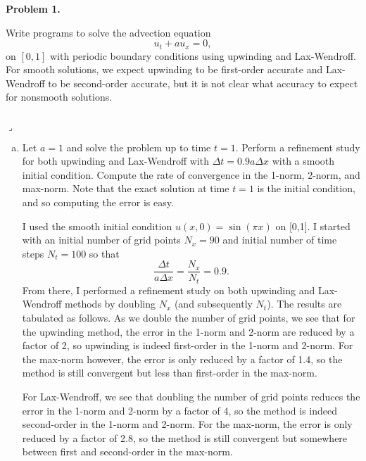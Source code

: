 \documentclass[12pt]{article}
\newenvironment{myprob}[1]
    {%
    \noindent{\Huge$\ulcorner$}\textbf{#1.}\begin{em}
    }
    { 
    \end{em} \\ \hphantom{l} \hfill {\Huge$\lrcorner$} }
\begin{document}
\rhead{\today}

{\let\newpage\relax} 


\begin{myprob}{Problem 1}
Write programs to solve the advection equation
$$u_t + au_x = 0, $$
on $[0,1]$ with periodic boundary conditions using upwinding and Lax-Wendroff.  For smooth solutions, we expect upwinding to be first-order accurate and Lax-Wendroff to be second-order accurate, but it is not clear what accuracy to expect for nonsmooth solutions.
\end{myprob}
\begin{enumerate}[(a)]
\item Let $a=1$ and solve the problem up to time $t=1$.  Perform a refinement study for both upwinding and Lax-Wendroff with $\Delta t=0.9a\Delta x$ with a smooth initial condition.  Compute the rate of convergence in the 1-norm, 2-norm, and max-norm.  Note that the exact solution at time $t=1$ is the initial condition, and so computing the error is easy.

I used the smooth initial condition $u(x,0) = \sin(\pi x)$ on [0,1].  I started with an initial number of grid points $N_x = 90$ and initial number of time steps $N_t = 100$ so that $$\dfrac{\Delta t}{a\Delta x} = \dfrac{N_x}{N_t} = 0.9.$$From there, I performed a refinement study on both upwinding and Lax-Wendroff methods by doubling $N_x$ (and subsequently $N_t$).  The results are tabulated as follows. As we double the number of grid points, we see that for the upwinding method, the error in the 1-norm and 2-norm are reduced by a factor of 2, so upwinding is indeed first-order in the 1-norm and 2-norm.  For the max-norm however, the error is only reduced by a factor of 1.4, so the method is still convergent but less than first-order in the max-norm.

For Lax-Wendroff, we see that doubling the number of grid points reduces the error in the 1-norm and 2-norm by a factor of 4, so the method is indeed second-order in the 1-norm and 2-norm.  For the max-norm, the error is only reduced by a factor of 2.8, so the method is still convergent but somewhere between first and second-order in the max-norm.


\end{enumerate}
\end{document}
